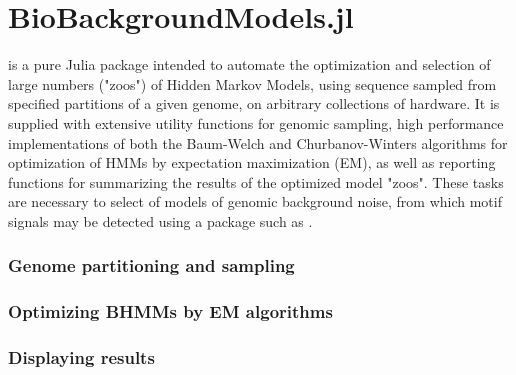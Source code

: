 \chapter{BioBackgroundModels.jl}
\label{ch:BBM}

 is a pure Julia package intended to automate the optimization and selection of large numbers ("zoos") of Hidden Markov Models, using sequence sampled from specified partitions of a given genome, on arbitrary collections of hardware. It is supplied with extensive utility functions for genomic sampling, high performance implementations of both the Baum-Welch and Churbanov-Winters algorithms for optimization of HMMs by expectation maximization (EM), as well as reporting functions for summarizing the results of the optimized model "zoos". These tasks are necessary to select of models of genomic background noise, from which motif signals may be detected using a package such as .

\subsection{Genome partitioning and sampling}



\subsection{Optimizing BHMMs by EM algorithms}


\subsection{Displaying results}